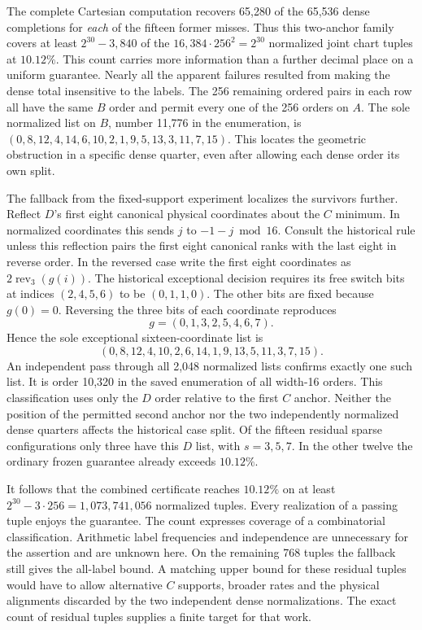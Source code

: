 The complete Cartesian computation recovers 65,280 of the 65,536 dense completions for \emph{each} of the fifteen former misses. Thus this two-anchor family covers at least \(2^{30}-3{,}840\) of the \(16{,}384\cdot256^2=2^{30}\) normalized joint chart tuples at \(10.12\%\). This count carries more information than a further decimal place on a uniform guarantee. Nearly all the apparent failures resulted from making the dense total insensitive to the labels. The 256 remaining ordered pairs in each row all have the same \(B\) order and permit every one of the 256 orders on \(A\). The sole normalized list on \(B\), number 11,776 in the enumeration, is \((0,8,12,4,14,6,10,2,1,9,5,13,3,11,7,15)\). This locates the geometric obstruction in a specific dense quarter, even after allowing each dense order its own split.

The fallback from the fixed-support experiment localizes the survivors further. Reflect \(D\)'s first eight canonical physical coordinates about the \(C\) minimum. In normalized coordinates this sends \(j\) to \(-1-j\bmod16\). Consult the historical rule unless this reflection pairs the first eight canonical ranks with the last eight in reverse order. In the reversed case write the first eight coordinates as \(2\operatorname{rev}_3(g(i))\). The historical exceptional decision requires its free switch bits at indices \((2,4,5,6)\) to be \((0,1,1,0)\). The other bits are fixed because \(g(0)=0\). Reversing the three bits of each coordinate reproduces
\[
    g=(0,1,3,2,5,4,6,7).
\]
Hence the sole exceptional sixteen-coordinate list is
\[
 (0,8,12,4,10,2,6,14,1,9,13,5,11,3,7,15).
\]
An independent pass through all 2,048 normalized lists confirms exactly one such list. It is order 10,320 in the saved enumeration of all width-16 orders. This classification uses only the \(D\) order relative to the first \(C\) anchor. Neither the position of the permitted second anchor nor the two independently normalized dense quarters affects the historical case split. Of the fifteen residual sparse configurations only three have this \(D\) list, with \(s=3,5,7\). In the other twelve the ordinary frozen guarantee already exceeds \(10.12\%\).

It follows that the combined certificate reaches \(10.12\%\) on at least \(2^{30}-3\cdot256=1{,}073{,}741{,}056\) normalized tuples. Every realization of a passing tuple enjoys the guarantee. The count expresses coverage of a combinatorial classification. Arithmetic label frequencies and independence are unnecessary for the assertion and are unknown here. On the remaining 768 tuples the fallback still gives the all-label bound. A matching upper bound for these residual tuples would have to allow alternative \(C\) supports, broader rates and the physical alignments discarded by the two independent dense normalizations. The exact count of residual tuples supplies a finite target for that work.


